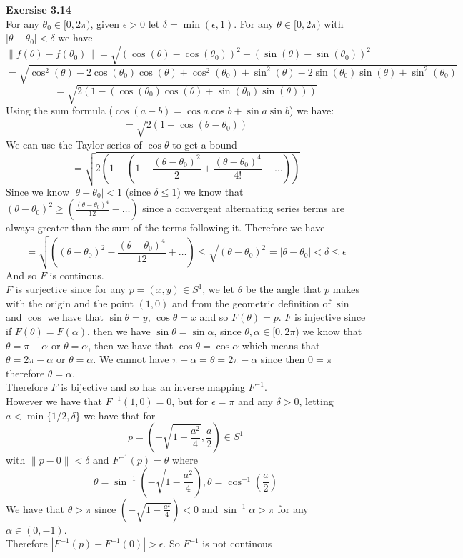 \documentclass[12pt]{article}
\newenvironment{ques}[1]{\textbf{Exersise #1}\vspace{1 mm}\\ }{\bigskip}
\theoremstyle{definition}
\renewcommand{\l}{\left }
\renewcommand{\r}{\right }
\newcommand{\s}{\sin}
\renewcommand{\c}{\cos}
\renewcommand{\t}{\theta}
\renewcommand{\a}{\alpha}
\newcommand{\norm}[1]{\left\lVert#1\right\rVert}
\begin{document}
\begin{ques}{3.14}
	For any $\theta_0 \in [0,2\pi)$, given $\epsilon > 0$ let $\delta =
	\min(\epsilon, 1)$.
	For any $\theta \in [0,2\pi)$ with $|\theta - \theta_0| < \delta$ we
	have 
	$$\lVert f(\theta) - f(\theta_0) \rVert = \sqrt{(\cos(\theta) -
	\cos(\theta_0))^2 + (\sin(\theta) - \sin(\theta_0))^2}$$
	$$= \sqrt{\cos^2(\theta) - 2\cos(\theta_0)\cos(\theta) +
	\cos^2(\theta_0) +\sin^2(\theta) - 2\sin(\theta_0)\sin(\theta) +
	\sin^2(\theta_0)}$$
	$$= \sqrt{2(1 - (\cos(\theta_0)\cos(\theta) + \sin(\theta_0)\sin(\theta)))}$$
	Using the sum formula ($\cos(a - b) = \cos a\cos b + \sin a \sin b$) we have:
	$$= \sqrt{2(1 - \cos(\theta - \theta_0))}$$
	We can use the Taylor series of $\c \theta$ to get a bound 
	$$= \sqrt{2\l(1 - \l(1 - \frac {(\t - \t_0)^2}{2} + \frac{(\t -
	\t_0)^4}{4!} - \dots \r )\r ) }$$
	Since we know $|\t - \t_0| < 1$ (since $\delta \leq 1$) we know that
	$(\t - \t_0)^2 \geq \l(\frac{(\t - \t_0)^4}{12} - \dots \r )$ since a
	convergent alternating series terms are always greater than the sum of
	the terms following it. Therefore we have
	$$ = \sqrt{\l((\t - \t_0)^2 - \frac{(\t -
	\t_0)^4}{12} + \dots \r )} \leq \sqrt{(\t - \t_0)^2} = |\t - \t_0| <
	\delta \leq \epsilon$$
	And so $F$ is continous.\\
	$F$ is surjective since for any $p = (x,y) \in S^1$, we let $\t$ be the
	angle that $p$ makes with the origin and the point $(1,0)$ and from the
	geometric definition of $\s$ and $\c$ we have that $\s \t = y$, $\c \t
	= x$ and so $F(\t) = p$. $F$ is injective since if $F(\t) = F(\a)$,
	then we have $\s \t = \s \a$, since $\t, \a \in [0, 2\pi)$ we know that
	$\t = \pi - \a$ or $\t = \a$, then we have that $\c \t = \c \a$ which
	means that $\t = 2\pi - \a$ or $\t = \a$. We cannot have $\pi - \a = \t
	= 2\pi - \a$ since then $0 = \pi$ therefore $\t = \a$.\\
	Therefore $F$ is bijective and so has an inverse mapping $F^{-1}$.\\
	However we have that $F^{-1}(1,0) = 0$, but for $\epsilon = \pi$ and
	any $\delta > 0$, letting $a < \min \{1/2, \delta\}$ we have that for
	$$ p = \l(-\sqrt{1 - \frac{a^2}{4}} , \frac a 2 \r) \in S^1$$
	with $\norm{p - 0} < \delta$ and $F^{-1}(p) = \t$ where
	$$\t = \sin^{-1}\l(-\sqrt{1 - \frac{a^2}{4}}\r), \t = \c^{-1} \l( \frac a 2 \r) $$
	We have that $\t > \pi$ since $\l(-\sqrt{1 - \frac{a^2}{4}}\r) < 0$ and
	$\s^{-1} \a > \pi$ for any $\a \in (0, -1)$.\\
	Therefore $|F^{-1}(p) - F^{-1}(0)| > \epsilon$. So $F^{-1}$ is not
	continous
	
\end{ques}
\end{document}
